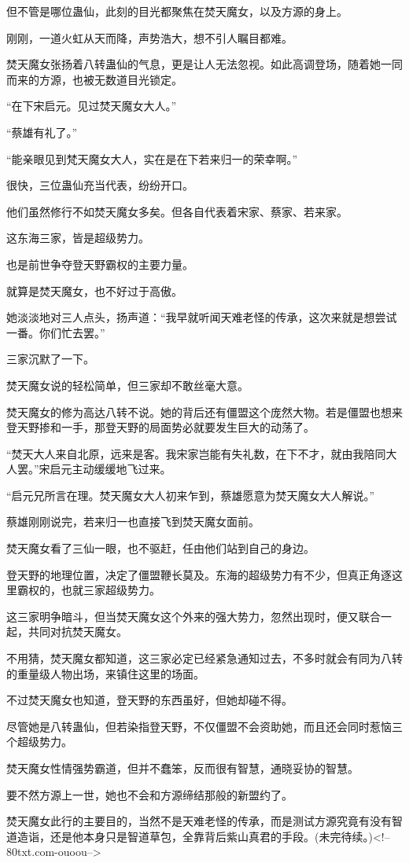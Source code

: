 \begin{this_body}
但不管是哪位蛊仙，此刻的目光都聚焦在焚天魔女，以及方源的身上。

刚刚，一道火虹从天而降，声势浩大，想不引人瞩目都难。

焚天魔女张扬着八转蛊仙的气息，更是让人无法忽视。如此高调登场，随着她一同而来的方源，也被无数道目光锁定。

“在下宋启元。见过焚天魔女大人。”

“蔡雄有礼了。”

“能亲眼见到梵天魔女大人，实在是在下若来归一的荣幸啊。”

很快，三位蛊仙充当代表，纷纷开口。

他们虽然修行不如焚天魔女多矣。但各自代表着宋家、蔡家、若来家。

这东海三家，皆是超级势力。

也是前世争夺登天野霸权的主要力量。

就算是焚天魔女，也不好过于高傲。

她淡淡地对三人点头，扬声道：“我早就听闻天难老怪的传承，这次来就是想尝试一番。你们忙去罢。”

三家沉默了一下。

焚天魔女说的轻松简单，但三家却不敢丝毫大意。

焚天魔女的修为高达八转不说。她的背后还有僵盟这个庞然大物。若是僵盟也想来登天野掺和一手，那登天野的局面势必就要发生巨大的动荡了。

“焚天大人来自北原，远来是客。我宋家岂能有失礼数，在下不才，就由我陪同大人罢。”宋启元主动缓缓地飞过来。

“启元兄所言在理。焚天魔女大人初来乍到，蔡雄愿意为焚天魔女大人解说。”

蔡雄刚刚说完，若来归一也直接飞到焚天魔女面前。

焚天魔女看了三仙一眼，也不驱赶，任由他们站到自己的身边。

登天野的地理位置，决定了僵盟鞭长莫及。东海的超级势力有不少，但真正角逐这里霸权的，也就三家超级势力。

这三家明争暗斗，但当焚天魔女这个外来的强大势力，忽然出现时，便又联合一起，共同对抗焚天魔女。

不用猜，焚天魔女都知道，这三家必定已经紧急通知过去，不多时就会有同为八转的重量级人物出场，来镇住这里的场面。

不过焚天魔女也知道，登天野的东西虽好，但她却碰不得。

尽管她是八转蛊仙，但若染指登天野，不仅僵盟不会资助她，而且还会同时惹恼三个超级势力。

焚天魔女性情强势霸道，但并不蠢笨，反而很有智慧，通晓妥协的智慧。

要不然方源上一世，她也不会和方源缔结那般的新盟约了。

焚天魔女此行的主要目的，当然不是天难老怪的传承，而是测试方源究竟有没有智道造诣，还是他本身只是智道草包，全靠背后紫山真君的手段。(未完待续。)<!--80txt.com-ouoou-->

\end{this_body}

